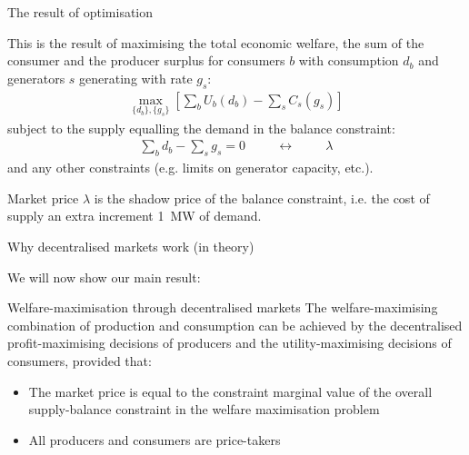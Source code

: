 \documentclass[10pt,dvipsnames]{beamer}
\def\l{\lambda}
\let\olditem\item
\renewcommand{\item}{%
\olditem\vspace{5pt}}
\begin{document}
\begin{frame}{The result of optimisation}

  This is the result of maximising the \alert{total economic welfare}, the sum of the consumer and the producer surplus for consumers $b$ with consumption $d_b$ and generators $s$ generating with rate $g_s$:
  \begin{align*}
    \max_{\{d_b\}, \{g_s\}}\left[ \sum_b U_b (d_b)  -  \sum_s C_s (g_s) \right]
  \end{align*}
  subject to the supply equalling the demand in the balance constraint:
  \begin{align*}
    \sum_b d_b -  \sum_s g_s  = 0 \hspace{1cm} \leftrightarrow \hspace{1cm} \l
  \end{align*}
  and any other constraints (e.g. limits on generator capacity, etc.).

  Market price $\l$ is the shadow price of the balance constraint,
  i.e. the cost of supply an extra increment 1~MW of demand.

\end{frame}


\begin{frame}{Why decentralised markets work (in theory)}

  We will now show our main result:

      \begin{alertblock}{Welfare-maximisation through decentralised markets}
        The welfare-maximising combination of production and consumption can be achieved by the decentralised profit-maximising decisions of producers and the utility-maximising decisions of consumers, provided that:
        \begin{itemize}
        \item The market price is equal to the constraint marginal value of the overall supply-balance constraint in the welfare maximisation problem
          \item All producers and consumers are price-takers
        \end{itemize}
      \end{alertblock}

\end{frame}
\end{document}
